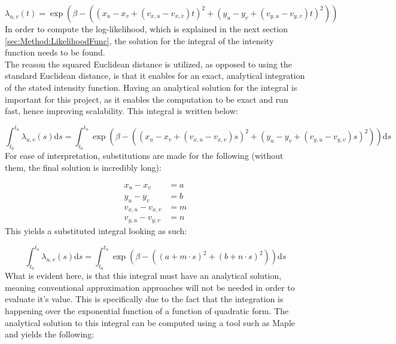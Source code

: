 \begin{equation}
    \lambda_{u,v}(t)
    =
    \exp \left(\beta - \left((x_u - x_v + (v_{x,u} - v_{x,v})t)^2 + (y_u - y_v + ( v_{y,u} - v_{y,v})t)^2\right)\right)
\end{equation}
In order to compute the log-likelihood, which is explained in the next section \ref{sec:Method:LikelihoodFunc}, the solution for the integral of the intensity function needs to be found. 
\\
The reason the squared Euclidean distance is utilized, as opposed to using the standard Euclidean distance, is that it enables for an exact, analytical integration of the stated intensity function.
Having an analytical solution for the integral is important for this project, as it enables the computation to be exact and run fast, hence improving scalability.
This integral is written below:

\begin{equation}
    \int_{t_0}^{t_{n}} \lambda_{u,v}(s) \mathrm{d}s 
    =
    \int_{t_0}^{t_n} \exp \left(\beta - \left((x_u - x_v + (v_{x,u} - v_{x,v})s)^2 + (y_u - y_v + ( v_{y,u} - v_{y,v})s)^2\right)\right) \mathrm{d}s
\end{equation}
For ease of interpretation, substitutions are made for the following (without them, the final solution is incredibly long):

\begin{align}
    x_u - x_v &= a
    \\
    y_u - y_v &= b
    \\
    v_{x,u} - v_{x,v} &= m
    \\
    v_{y,u} - v_{y,v} &= n
\end{align}
This yields a substituted integral looking as such:

\begin{equation}
    \int_{t_0}^{t_n} \lambda_{u,v}(s) \mathrm{d}s 
    =
    \int_{t_0}^{t_n} \exp \left(\beta - \left((a + m \cdot s)^2 + (b + n \cdot s)^2\right)\right) \mathrm{d}s
\end{equation}
What is evident here, is that this integral must have an analytical solution, meaning conventional approximation approaches will not be needed in order to evaluate it's value. 
This is specifically due to the fact that the integration is happening over the exponential function of a function of quadratic form.
The analytical solution to this integral can be computed using a tool such as Maple and yields the following:

